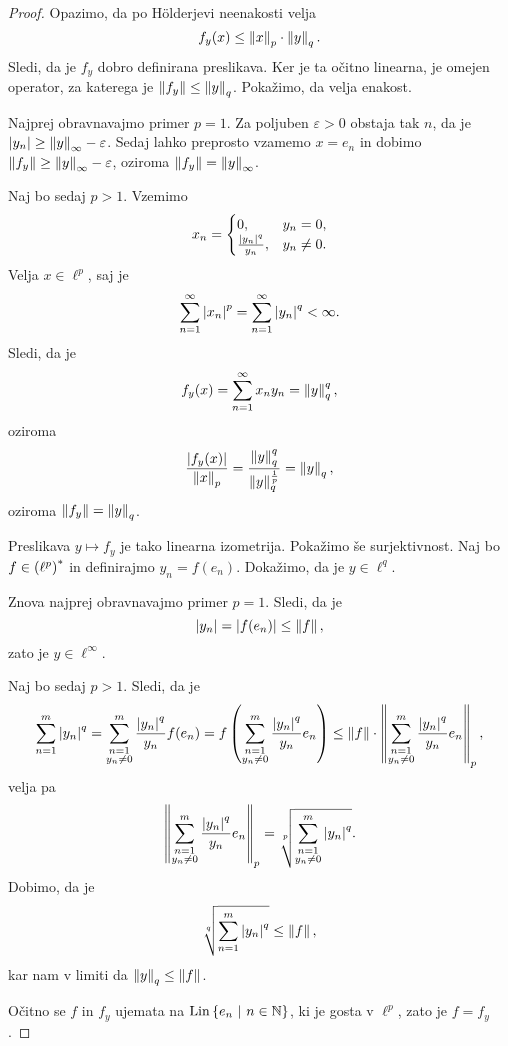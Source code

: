 \begin{proof}
Opazimo, da po Hölderjevi neenakosti velja
\[
f_y(x) \leq \left\lVert x\right\rVert_p \cdot \left\lVert y\right\rVert_q.
\]
Sledi, da je $f_y$ dobro definirana preslikava. Ker je ta očitno
linearna, je omejen operator, za katerega je
$\left\lVert f_y\right\rVert \leq \left\lVert y\right\rVert_q$. Pokažimo, da velja enakost.

Najprej obravnavajmo primer $p=1$. Za poljuben $\varepsilon > 0$
obstaja tak $n$, da je
$\left\lvert y_n\right\rvert \geq \left\lVert y\right\rVert_\infty - \varepsilon$. Sedaj lahko
preprosto vzamemo $x = e_n$ in dobimo
$\left\lVert f_y\right\rVert \geq \left\lVert y\right\rVert_\infty - \varepsilon$, oziroma
$\left\lVert f_y\right\rVert = \left\lVert y\right\rVert_\infty$.

Naj bo sedaj $p > 1$. Vzemimo
\[
x_n = \begin{cases}
0, & y_n = 0, \\
\frac{\left\lvert y_n\right\rvert^q}{y_n}, & y_n \ne 0.
\end{cases}
\]
Velja $x \in \ell^p$, saj je
\[
\sum_{n=1}^\infty \left\lvert x_n\right\rvert^p =
\sum_{n=1}^\infty \left\lvert y_n\right\rvert^q <
\infty.
\]
Sledi, da je
\[
f_y(x) = \sum_{n=1}^\infty x_n y_n = \left\lVert y\right\rVert_q^q,
\]
oziroma
\[
\frac{\left\lvert f_y(x)\right\rvert}{\left\lVert x\right\rVert_p} =
\frac{\left\lVert y\right\rVert_q^q}{\left\lVert y\right\rVert_q^{\frac{1}{p}}} =
\left\lVert y\right\rVert_q,
\]
oziroma $\left\lVert f_y\right\rVert = \left\lVert y\right\rVert_q$.

Preslikava $y \mapsto f_y$ je tako linearna izometrija. Pokažimo še
surjektivnost. Naj bo $f \in \left(\ell^p\right)^*$ in definirajmo
$y_n = f(e_n)$. Dokažimo, da je $y \in \ell^q$.

Znova najprej obravnavajmo primer $p=1$. Sledi, da je
\[
\left\lvert y_n\right\rvert = \left\lvert f(e_n)\right\rvert \leq \left\lVert f\right\rVert,
\]
zato je $y \in \ell^\infty$.

Naj bo sedaj $p > 1$. Sledi, da je
\[
\sum_{n=1}^m \left\lvert y_n\right\rvert^q =
\sum_{\substack{n=1 \\ y_n \ne 0}}^m
\frac{\left\lvert y_n\right\rvert^q}{y_n} f(e_n) =
f \left(\sum_{\substack{n=1 \\ y_n \ne 0}}^m
\frac{\left\lvert y_n\right\rvert^q}{y_n} e_n\right) \leq
\left\lVert f\right\rVert \cdot \left\lVert \sum_{\substack{n=1 \\ y_n \ne 0}}^m
\frac{\left\lvert y_n\right\rvert^q}{y_n} e_n\right\rVert_p,
\]
velja pa
\[
\left\lVert \sum_{\substack{n=1 \\ y_n \ne 0}}^m
\frac{\left\lvert y_n\right\rvert^q}{y_n} e_n\right\rVert_p =
\sqrt[p]{\sum_{\substack{n=1 \\ y_n \ne 0}}^m \left\lvert y_n\right\rvert^q}.
\]
Dobimo, da je
\[
\sqrt[q]{\sum_{n=1}^m \left\lvert y_n\right\rvert^q} \leq \left\lVert f\right\rVert,
\]
kar nam v limiti da $\left\lVert y\right\rVert_q \leq \left\lVert f\right\rVert$.

Očitno se $f$ in $f_y$ ujemata na $\operatorname{Lin} \left\{e_n~\middle\vert~n \in \mathbb{N}\right\}$, ki
je gosta v $\ell^p$, zato je $f = f_y$.
\end{proof}

